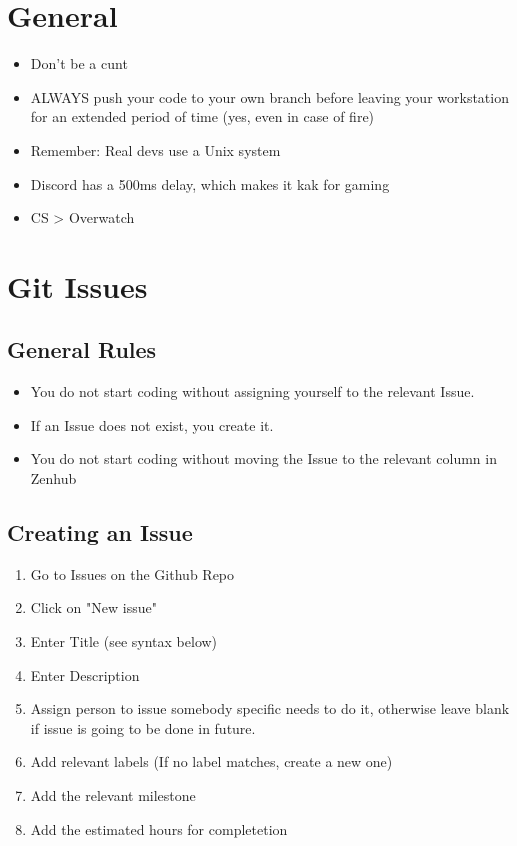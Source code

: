 \documentclass{article}
\begin{document}
\newpage
\tableofcontents
\newpage
	
	\section{General}
		\begin{itemize}
			\item Don't be a cunt
			\item ALWAYS push your code to your own branch before leaving your workstation for an extended period of time (yes, even in case of fire)
			\item Remember: Real devs use a Unix system
			\item Discord has a 500ms delay, which makes it kak for gaming
			\item CS > Overwatch
		\end{itemize}
		
	\section{Git Issues}
		\subsection{General Rules}
			\begin{itemize}
				\item You do not start coding without assigning yourself to the relevant Issue.
				\item If an Issue does not exist, you create it.
				\item You do not start coding without moving the Issue to the relevant column in Zenhub
			\end{itemize}
			
		\subsection{Creating an Issue}
			\begin{enumerate}
				\item Go to Issues on the Github Repo
				\item Click on "New issue"
				\item Enter Title (see syntax below)
				\item Enter Description
				\item Assign person to issue somebody specific needs to do it, otherwise leave blank if issue is going to be done in future.
				\item Add relevant labels (If no label matches, create a new one)
				\item Add the relevant milestone
				\item Add the estimated hours for completetion
			\end{enumerate}
\end{document}
